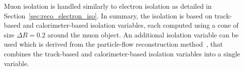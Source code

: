 Muon isolation is handled similarly to electron isolation as detailed in Section~\ref{sec:reco_electron_iso}. In summary, the isolation is based on track-based and calorimeter-based isolation variables, each computed using a cone of size $\Delta R = 0.2$ around the muon object. An additional isolation variable can be used which is derived from the particle-flow reconstruction method~\cite{ATLAS:2017ghe}, that combines the track-based and calorimeter-based isolation variables into a single variable.
